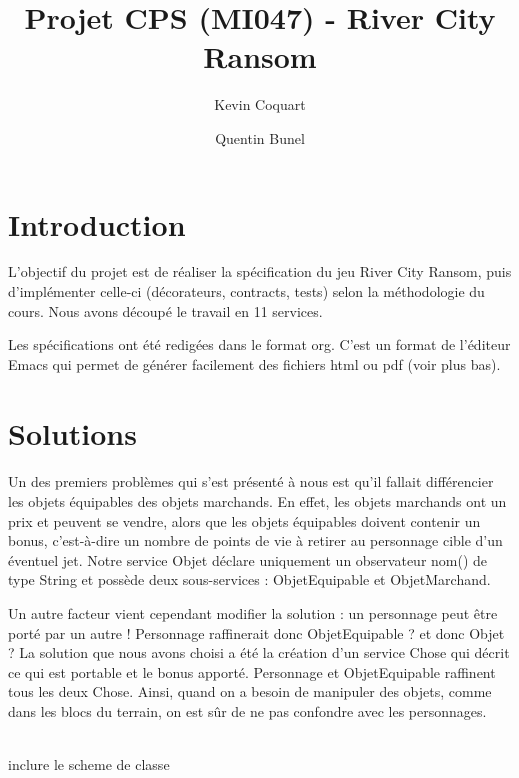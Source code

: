 \documentclass[a4paper,titlepage,openany,12pt]{report}
\title{Projet CPS (MI047) - River City Ransom}
\author{Kevin Coquart \and Quentin Bunel}
\begin{document}
\maketitle

\section*{Introduction}

L'objectif du projet est de réaliser la spécification du jeu River City Ransom,
puis d'implémenter celle-ci (décorateurs, contracts, tests) selon la méthodologie du cours.
Nous avons découpé le travail en 11 services.

Les spécifications ont été redigées dans le format org. C'est un format de l'éditeur Emacs
qui permet de générer facilement des fichiers html ou pdf (voir plus bas).

\section*{Solutions}

\paragraph{}
Un des premiers problèmes qui s'est présenté à nous est qu'il fallait différencier les objets équipables
des objets marchands. En effet, les objets marchands ont un prix et peuvent se vendre, alors que les objets 
équipables doivent contenir un bonus, c'est-à-dire un nombre de points de vie à retirer au personnage cible 
d'un éventuel jet. Notre service Objet déclare uniquement un observateur nom() de type String et possède deux 
sous-services : ObjetEquipable et ObjetMarchand.

Un autre facteur vient cependant modifier la solution : un personnage peut être porté par un autre !
Personnage raffinerait donc ObjetEquipable ? et donc Objet ?
La solution que nous avons choisi a été la création d'un service Chose qui décrit ce qui est portable et 
le bonus apporté. Personnage et ObjetEquipable raffinent tous les deux Chose.
Ainsi, quand on a besoin de manipuler des objets, comme dans les blocs du terrain, on est sûr de ne pas
confondre avec les personnages.

\\ inclure le scheme de classe
\end{document}
